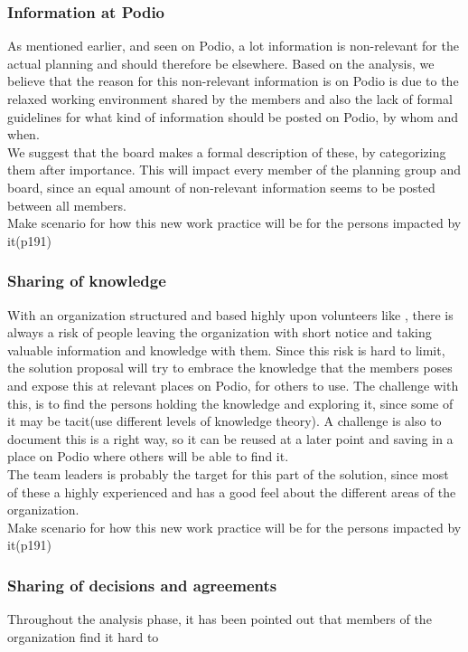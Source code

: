 \subsubsection{Information at Podio}
As mentioned earlier, and seen on Podio, a lot information is non-relevant for the actual planning and should therefore be elsewhere. Based on the analysis, we believe that the reason for this non-relevant information is on Podio is due to the relaxed working environment shared by the members and also the lack of formal guidelines for what kind of information should be posted on Podio, by whom and when.\\ 
We suggest that the board makes a formal description of these, by categorizing them after importance.
This will impact every member of the planning group and board, since an equal amount of non-relevant information seems to be posted between all members. \\
Make scenario for how this new work practice will be for the persons impacted by it(p191)
  
\subsubsection{Sharing of knowledge}
With an organization structured and based highly upon volunteers like \mil, there is always a risk of people leaving the organization with short notice and taking valuable information and knowledge with them. Since this risk is hard to limit, the solution proposal will try to embrace the knowledge that the members poses and expose this at relevant places on Podio, for others to use. The challenge with this, is to find the persons holding the knowledge and exploring it, since some of it may be tacit(use different levels of knowledge theory). A challenge is also to document this is a right way, so it can be reused at a later point and saving in a place on Podio where others will be able to find it.\\
The team leaders is probably the target for this part of the solution, since most of these a highly experienced and has a good feel about the different areas of the organization.\\

Make scenario for how this new work practice will be for the persons impacted by it(p191)

\subsubsection{Sharing of decisions and agreements}
Throughout the analysis phase, it has been pointed out that members of the organization find it hard to 

